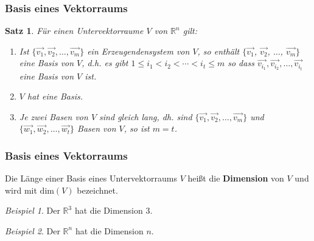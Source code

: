 \documentclass[hyperref={pdfpagelabels=false}]{beamer}
\theoremstyle{plain}%
\newtheorem*{satz}{Satz}
\theoremstyle{definition}
\theoremstyle{remark}
\newtheorem*{beispiel}{Beispiel}
\newcommand{\vektor}[1]{\overrightarrow{#1}}
\begin{document}
\begin{frame}
\frametitle{Basis eines Vektorraums}

\begin{satz}
Für einen Untervektorraume $V$ von $\mathbb R^n$ gilt:

\begin{enumerate}
\item<2-> Ist $\{\vektor{v_1}, \vektor{v_2}, \ldots, \vektor{v_m} \}$ ein Erzeugendensystem 
von $V$, so enthält $\{ \vektor{v_1}$, $\vektor{v_2}$, $\ldots$, $\vektor{v_m} \}$ eine 
Basis von $V$, d.h. es gibt $1 \leq i_1 < i_2 < \cdots < i_t \leq m$ so dass
$ \vektor{v_{i_1}}, \vektor{v_{i_2}}, \ldots, \vektor{v_{i_t}}$ eine Basis von $V$ ist.
\item<3-> $V$ hat eine Basis.
\item<4-> Je zwei Basen von $V$ sind gleich lang, dh. sind $\{\vektor{v_1}, \vektor{v_2}, \ldots, \vektor{v_m} \}$ 
und $\{\vektor{w_1}, \vektor{w_2}, \ldots, \vektor{w_t} \}$ Basen von $V$, so ist $m = t$.
\end{enumerate}
\end{satz}

\end{frame}

\begin{frame}
\frametitle{Basis eines Vektorraums}

\begin{definition} Die Länge einer Basis eines Untervektorraums $V$ heißt 
die \textbf{Dimension} von $V$ und wird mit $\textrm{dim}(V)$ bezeichnet.
\end{definition}

\pause 

\begin{beispiel} Der $\mathbb R^3$ hat die Dimension $3$.
\end{beispiel}

\pause 

\begin{beispiel} Der $\mathbb R^n$ hat die Dimension $n$.
\end{beispiel}


\end{frame}
\end{document}

